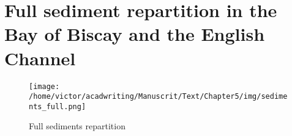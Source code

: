 \documentclass[../../Main_ManuscritThese.tex]{subfiles}
\begin{document}


  \section{Full sediment repartition in the Bay of Biscay and the English Channel}
  \label{sec:sediments_full}
\begin{figure}[ht]
  \centering
  \texttt{[image: /home/victor/acadwriting/Manuscrit/Text/Chapter5/img/sediments\_full.png]}
  \caption{\label{fig:sediments_full} Full sediments repartition}
\end{figure}
\end{document}
